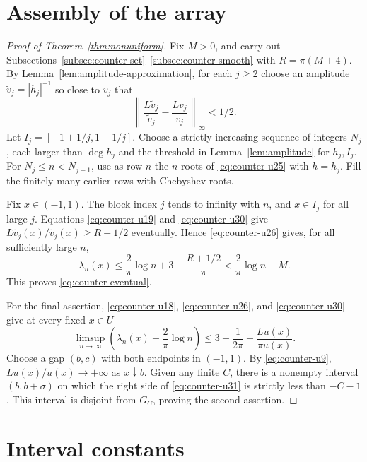\documentclass[11pt]{article}
\theoremstyle{remark}
\numberwithin{equation}{section}
\begin{document}
\section{Assembly of the array}\label{subsec:counter-array}

\begin{proof}[Proof of Theorem~\ref{thm:nonuniform}]

Fix \(M>0\), and carry out Subsections~\ref{subsec:counter-set}--\ref{subsec:counter-smooth} with \(R=\pi(M+4)\).
By Lemma~\ref{lem:amplitude-approximation}, for each \(j\ge2\) choose an amplitude \(\widetilde v_j=|h_j|^{-1}\) so close to \(v_j\) that
\begin{equation}\label{eq:counter-u30}
\left\|\frac{L\widetilde v_j}{\widetilde v_j}
                 -\frac{Lv_j}{v_j}\right\|_\infty<1/2.
\end{equation}
Let \(I_j=[-1+1/j,1-1/j]\). Choose a strictly increasing sequence of integers \(N_j\), each larger than \(\deg h_j\) and the threshold in Lemma~\ref{lem:amplitude} for \(h_j,I_j\). For \(N_j\le n<N_{j+1}\), use as row \(n\) the \(n\) roots of \eqref{eq:counter-u25} with \(h=h_j\). Fill the finitely many earlier rows with Chebyshev roots.

Fix \(x\in(-1,1)\). The block index \(j\) tends to infinity with \(n\), and \(x\in I_j\) for all large \(j\). Equations \eqref{eq:counter-u19} and \eqref{eq:counter-u30} give
\(L\widetilde v_j(x)/\widetilde v_j(x)\ge R+1/2\) eventually. Hence \eqref{eq:counter-u26} gives, for all sufficiently large \(n\),
\[
 \lambda_n(x)\le\frac2\pi\log n+3-\frac{R+1/2}{\pi}
 <\frac2\pi\log n-M.
\]
This proves \eqref{eq:counter-eventual}.

For the final assertion, \eqref{eq:counter-u18}, \eqref{eq:counter-u26}, and \eqref{eq:counter-u30} give at every fixed \(x\in U\)
\begin{equation}\label{eq:counter-u31}
\limsup_{n\to\infty}
 \left(\lambda_n(x)-\frac2\pi\log n\right)
 \le3+\frac1{2\pi}-\frac{Lu(x)}{\pi u(x)}.
\end{equation}
Choose a gap \((b,c)\) with both endpoints in \((-1,1)\). By \eqref{eq:counter-u9}, \(Lu(x)/u(x)\to+\infty\) as \(x\downarrow b\). Given any finite \(C\), there is a nonempty interval \((b,b+\sigma)\) on which the right side of \eqref{eq:counter-u31} is strictly less than \(-C-1\). This interval is disjoint from \(G_C\), proving the second assertion. \end{proof}


\section{Interval constants}
\end{document}

